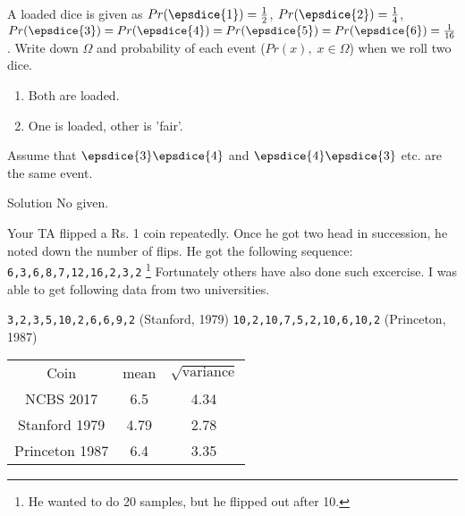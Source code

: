 \documentclass[a4paper,9pt, addpoints, solutions]{exam}
\begin{document}
\begin{questions}

\question[5] A loaded dice is given as $Pr(\epsdice{1})=\frac{1}{2}$,
$Pr(\epsdice{2})=\frac{1}{4}$, $Pr(\epsdice{3}) = Pr(\epsdice{4}) = Pr(
\epsdice{5}) = Pr(\epsdice{6}) = \frac{1}{16}$. Write down $\Omega$ and
probability of each event ($Pr(x),\; x \in \Omega$) when we roll two dice.
\begin{enumerate}
    \item Both are loaded.
    \item One is loaded, other is 'fair'.
\end{enumerate}
Assume that $\epsdice{3}\epsdice{4}$ and $\epsdice{4}\epsdice{3}$ etc. are the
same event.

\begin{solution}
Solution No given.
\end{solution}

\question[5]
Your TA flipped a Rs. 1 coin repeatedly. Once he got two head in succession,
he noted down the number of flips. He got the following sequence:
\verb|6,3,6,8,7,12,16,2,3,2| \footnote{He wanted to do 20 samples, but he flipped out after 10.}
Fortunately others have also done such excercise. I was able to get following
data from two universities.

\verb|3,2,3,5,10,2,6,6,9,2|     (Stanford, 1979)
\verb|10,2,10,7,5,2,10,6,10,2|  (Princeton, 1987)


\begin{solution}
    

\begin{tabular}{c c  c}
 Coin         & mean & $\sqrt{\text{variance}}$ \\
NCBS 2017     & 6.5  & 4.34  \\
Stanford 1979 & 4.79 & 2.78  \\
Princeton 1987& 6.4  & 3.35  \\
\end{tabular}


\end{solution}
\end{questions}
\end{document}
